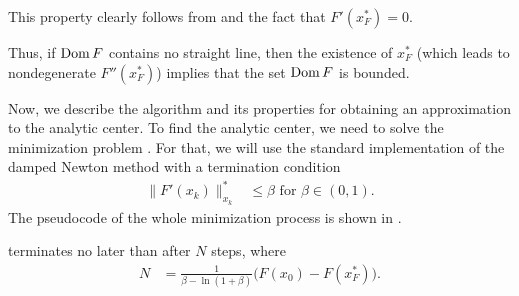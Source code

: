 This property clearly follows from  and the fact that $F'(x^*_F) = 0$.

Thus, if $\operatorname{Dom} F$ contains no straight line, then the existence of $x^*_F$ (which leads to nondegenerate $F''(x^*_F)$) implies that the set $\operatorname{Dom} F$ is bounded.

Now, we describe the algorithm and its properties for obtaining an approximation to the analytic center.
To find the analytic center, we need to solve the minimization problem .
For that, we will use the standard implementation of the damped Newton method with a termination condition
\begin{align}
  \|F'(x_k)\|^*_{x_k} &\leq \beta \text{ for } \beta\in(0,1).
\end{align}
The pseudocode of the whole minimization process is shown in .



\begin{theorem}
   terminates no later than after $N$ steps, where
  \begin{align}
    N &= \frac{1}{\beta - \ln(1+\beta)}\big(F(x_0) - F(x^*_F)\big).
  \end{align}
\end{theorem}

